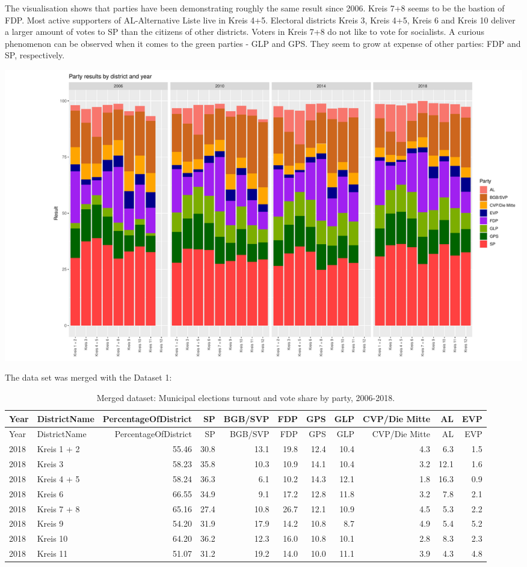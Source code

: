 \documentclass[
]{article}
\begin{document}
The visualisation shows that parties have been demonstrating roughly the
same result since 2006. Kreis 7+8 seems to be the bastion of FDP. Most
active supporters of AL-Alternative Liste live in Kreis 4+5. Electoral
districts Kreis 3, Kreis 4+5, Kreis 6 and Kreis 10 deliver a larger
amount of votes to SP than the citizens of other districts. Voters in
Kreis 7+8 do not like to vote for socialists. A curious phenomenon can
be observed when it comes to the green parties - GLP and GPS. They seem
to grow at expense of other parties: FDP and SP, respectively.

\includegraphics{report_files/figure-latex/plot Parties in Districts-1.pdf}

The data set was merged with the Dataset 1:

\begin{longtable}[]{@{}llrrrrrrrrr@{}}
\caption{Merged dataset: Municipal elections turnout and vote share by
party, 2006-2018.}\tabularnewline
\toprule
Year & DistrictName & PercentageOfDistrict & SP & BGB/SVP & FDP & GPS &
GLP & CVP/Die Mitte & AL & EVP\tabularnewline
\midrule
\endfirsthead
\toprule
Year & DistrictName & PercentageOfDistrict & SP & BGB/SVP & FDP & GPS &
GLP & CVP/Die Mitte & AL & EVP\tabularnewline
\midrule
\endhead
2018 & Kreis 1 + 2 & 55.46 & 30.8 & 13.1 & 19.8 & 12.4 & 10.4 & 4.3 &
6.3 & 1.5\tabularnewline
2018 & Kreis 3 & 58.23 & 35.8 & 10.3 & 10.9 & 14.1 & 10.4 & 3.2 & 12.1 &
1.6\tabularnewline
2018 & Kreis 4 + 5 & 58.24 & 36.3 & 6.1 & 10.2 & 14.3 & 12.1 & 1.8 &
16.3 & 0.9\tabularnewline
2018 & Kreis 6 & 66.55 & 34.9 & 9.1 & 17.2 & 12.8 & 11.8 & 3.2 & 7.8 &
2.1\tabularnewline
2018 & Kreis 7 + 8 & 65.16 & 27.4 & 10.8 & 26.7 & 12.1 & 10.9 & 4.5 &
5.3 & 2.2\tabularnewline
2018 & Kreis 9 & 54.20 & 31.9 & 17.9 & 14.2 & 10.8 & 8.7 & 4.9 & 5.4 &
5.2\tabularnewline
2018 & Kreis 10 & 64.20 & 36.2 & 12.3 & 16.0 & 10.8 & 10.1 & 2.8 & 8.3 &
2.3\tabularnewline
2018 & Kreis 11 & 51.07 & 31.2 & 19.2 & 14.0 & 10.0 & 11.1 & 3.9 & 4.3 &
4.8\tabularnewline
\bottomrule
\end{longtable}
\end{document}
